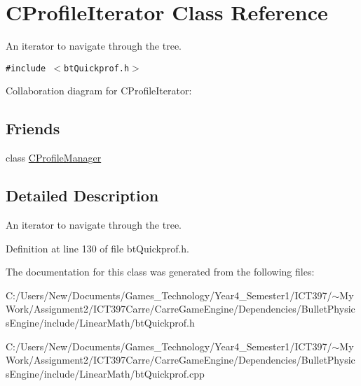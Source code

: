 \hypertarget{class_c_profile_iterator}{
\section{CProfileIterator Class Reference}
\label{class_c_profile_iterator}
}
An iterator to navigate through the tree.  


{\tt \#include $<$btQuickprof.h$>$}

Collaboration diagram for CProfileIterator:\subsection*{Friends}
\begin{CompactItemize}
\item 
\hypertarget{class_c_profile_iterator_7c8684494a3a73a8d3f19e229442b19a}{
class \hyperlink{class_c_profile_iterator_7c8684494a3a73a8d3f19e229442b19a}{CProfileManager}}
\label{class_c_profile_iterator_7c8684494a3a73a8d3f19e229442b19a}

\end{CompactItemize}


\subsection{Detailed Description}
An iterator to navigate through the tree. 

Definition at line 130 of file btQuickprof.h.

The documentation for this class was generated from the following files:\begin{CompactItemize}
\item 
C:/Users/New/Documents/Games\_\-Technology/Year4\_\-Semester1/ICT397/$\sim$My Work/Assignment2/ICT397Carre/CarreGameEngine/Dependencies/BulletPhysicsEngine/include/LinearMath/btQuickprof.h\item 
C:/Users/New/Documents/Games\_\-Technology/Year4\_\-Semester1/ICT397/$\sim$My Work/Assignment2/ICT397Carre/CarreGameEngine/Dependencies/BulletPhysicsEngine/include/LinearMath/btQuickprof.cpp\end{CompactItemize}

